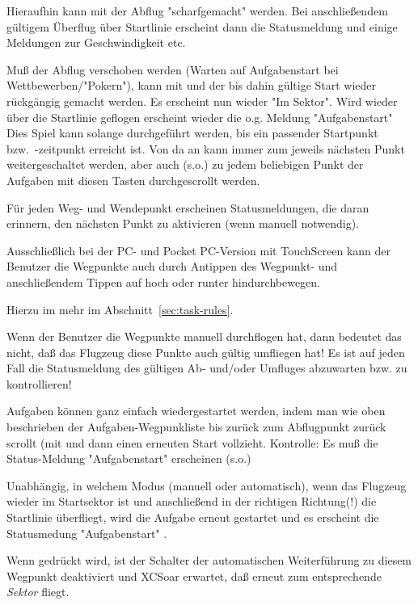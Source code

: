 Hieraufhin kann mit  der Abflug "scharfgemacht" werden. Bei anschließendem gültigem Überflug über Startlinie erscheint dann die Statusmeldung    und einige Meldungen zur  Geschwindigkeit etc.

Muß der Abflug verschoben werden (Warten auf Aufgabenstart bei Wettbewerben/"Pokern"), kann mit  und  der bis dahin gültige Start wieder rückgängig gemacht werden. Es erscheint nun wieder "Im Sektor".
Wird wieder über die Startlinie geflogen erscheint wieder die o.g. Meldung "Aufgabenstart"  Dies Spiel kann solange durchgeführt werden, bis ein passender Startpunkt bzw.\ -zeitpunkt  erreicht ist. Von da an kann immer zum jeweils nächsten Punkt weitergeschaltet werden, aber auch (s.o.) zu jedem beliebigen Punkt der Aufgaben  mit diesen Tasten durchgescrollt werden.

Für jeden Weg- und Wendepunkt erscheinen Statusmeldungen, die daran erinnern, den nächsten Punkt zu aktivieren (wenn manuell notwendig).

Ausschließlich bei der  PC- und Pocket PC-Version mit TouchScreen kann der Benutzer die Wegpunkte auch durch Antippen des Wegpunkt-{\InfoBox} und anschließendem Tippen auf hoch oder runter hindurchbewegen.

Hierzu im mehr im Abschnitt~\ref{sec:task-rules}.

\warning Wenn der Benutzer die Wegpunkte  manuell durchflogen hat, dann bedeutet das nicht, daß das Flugzeug diese Punkte auch gültig umfliegen hat! Es ist auf jeden Fall die Statusmeldung des gültigen Ab- und/oder Umfluges abzuwarten bzw. zu kontrollieren!


\tip Aufgaben können ganz einfach wiedergestartet  werden, indem man wie oben beschrieben der Aufgaben-Wegpunkliste bis zurück zum Abflugpunkt zurück scrollt (mit  und dann einen erneuten Start vollzieht. Kontrolle: Es muß die Status-Meldung "Aufgabenstart" erscheinen (s.o.)

Unabhängig, in welchem Modus (manuell oder automatisch), wenn das Flugzeug wieder im Startsektor ist und anschließend in der \textcolor[rgb]{0.00,0.00,0.50}{richtigen Richtung(!)} die Startlinie überfliegt, wird die Aufgabe erneut gestartet und es erscheint die Statusmedung  "Aufgabenstart" .


Wenn  gedrückt wird, ist der Schalter der automatischen Weiterführung zu diesem Wegpunkt deaktiviert und \textsf{XCSoar} erwartet, daß erneut zum entsprechende \textsl{Sektor} fliegt.

